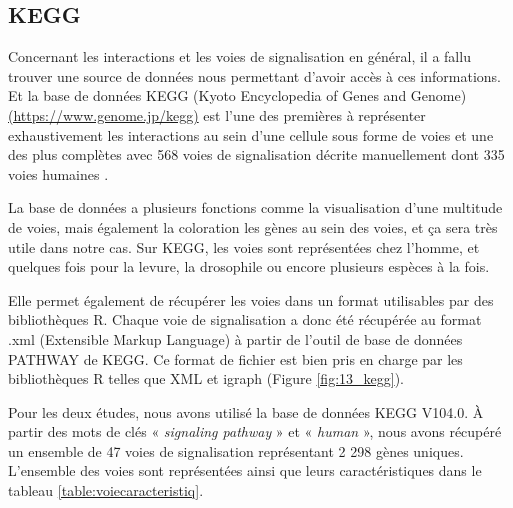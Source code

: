 \subsection{KEGG}\label{kegg}
\par Concernant les interactions et les voies de signalisation en général, il a fallu trouver une source de données nous permettant d’avoir accès à ces informations. Et la base de données KEGG (Kyoto Encyclopedia of Genes and Genome) \href{https://www.genome.jp/kegg}{(https://www.genome.jp/kegg)} est l’une des premières à représenter exhaustivement les interactions au sein d’une cellule sous forme de voies \parencite{bader_pathguide_2006} et une des plus complètes avec 568 voies de signalisation décrite manuellement dont 335 voies humaines \parencite{chanumolu_kegg2net_2021}.
\par La base de données a plusieurs fonctions comme la visualisation d’une multitude de voies, mais également la coloration les gènes au sein des voies, et ça sera très utile dans notre cas. Sur KEGG, les voies sont représentées chez l’homme, et quelques fois pour la levure, la drosophile ou encore plusieurs espèces à la fois. 
\par Elle permet également de récupérer les voies dans un format utilisables par des bibliothèques R. Chaque voie de signalisation a donc été récupérée au format .xml (Extensible Markup Language) à partir de l'outil de base de données PATHWAY de KEGG. Ce format de fichier est bien pris en charge par les bibliothèques R telles que XML \parencite{lang_xml_2023} et igraph \parencite{csardi_igraph_2023, csardi_igraph_2006} (Figure \ref{fig:13_kegg}).
\par Pour les deux études, nous avons utilisé la base de données KEGG V104.0. À partir des mots de clés « \textit{signaling pathway} » et « \textit{human} », nous avons récupéré un ensemble de 47 voies de signalisation représentant 2 298 gènes uniques. L’ensemble des voies sont représentées ainsi que leurs caractéristiques dans le tableau \ref{table:voiecaracteristiq}. 


